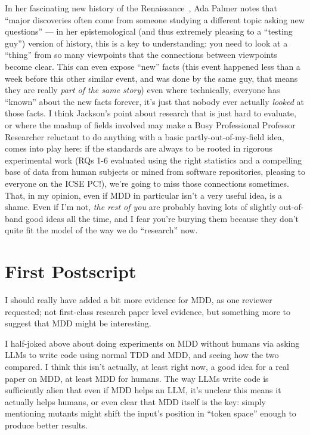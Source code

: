 \documentclass[sigplan,screen]{acmart}
\begin{document}
In her fascinating new history of the Renaissance~\cite{palmer}, Ada
Palmer notes that ``major discoveries often come from someone studying
a different topic asking new questions'' --- in her epistemological
(and thus extremely pleasing to a ``testing guy'') version of history,
this is a key to understanding:  you need to look at a ``thing'' from so many
viewpoints that the connections between viewpoints become clear.  This
can even expose ``new''
facts (this event happened less than a week before
this other similar event, and was done by the same guy, that means
they are really \emph{part of the same story}) even where technically,
everyone has ``known'' about the new facts forever, it's just that
nobody ever actually \emph{looked} at those facts.  I think Jackson's
point about research that is just hard to evaluate, or where the mashup of fields
involved may make a Busy Professional Professor Researcher reluctant
to do anything with a basic partly-out-of-my-field idea, comes into play here:  if the standards are
always to be rooted in rigorous experimental work (RQs 1-6 evaluated
using the right statistics and a compelling base of data from human
subjects or mined from software repositories, pleasing to everyone on
the ICSE PC!), we're going to miss those connections sometimes.
That, in my opinion, even if MDD in particular isn't a very useful
idea, is a shame.  Even if I'm not, \emph{the rest of you} are probably having lots of
slightly out-of-band good ideas all the time, and I fear you're
burying them because they don't quite fit the model of the way we do
``research'' now.

\section{First Postscript}

I should really have added a bit more evidence for MDD, as one
reviewer requested; not first-class research paper level evidence, but
something more to suggest that MDD might be interesting.

I half-joked above about doing experiments on MDD without humans via asking
LLMs to write code using normal TDD and MDD, and seeing how the two
compared.  I think this isn't actually, at least right now, a good
idea for a real paper on MDD, at least MDD for humans.  The way LLMs
write code is sufficiently alien that even if MDD helps an LLM, it's
unclear this means it actually helps humans, or even clear that MDD
itself is the key:  simply mentioning mutants might shift the input's
position in ``token space'' enough to produce better results.
\end{document}
